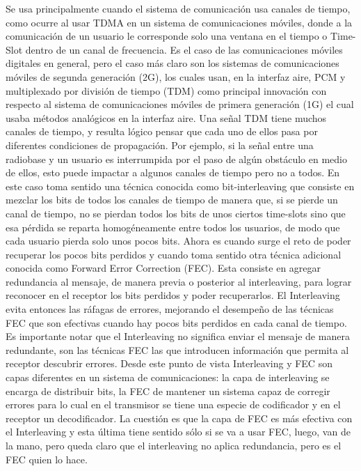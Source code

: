 Se usa principalmente cuando el sistema de comunicación usa canales de tiempo, como ocurre al usar TDMA en un sistema de comunicaciones móviles, donde a la comunicación de un usuario le corresponde solo una ventana en el tiempo o Time-Slot dentro de un canal de frecuencia. Es el caso de las comunicaciones móviles digitales en general, pero el caso más claro son los sistemas de comunicaciones móviles de segunda generación (2G), los cuales usan, en la interfaz aire, PCM y  multiplexado por división de tiempo (TDM) como principal innovación con respecto al sistema de comunicaciones móviles de primera generación (1G) el cual usaba métodos analógicos en la interfaz aire.
Una señal TDM tiene muchos canales de tiempo, y resulta lógico pensar que cada uno de ellos pasa por diferentes condiciones de propagación. Por ejemplo, si la señal entre una radiobase y un usuario es interrumpida por el paso de algún obstáculo en medio de ellos, esto puede impactar a algunos canales de tiempo pero no a todos. En este caso toma sentido una técnica conocida como bit-interleaving que consiste en mezclar los bits de todos los canales de tiempo de manera que, si se pierde un canal de tiempo, no se pierdan todos los bits de unos ciertos time-slots sino que esa pérdida se reparta homogéneamente entre todos los usuarios, de modo que cada usuario pierda solo unos pocos bits. Ahora es cuando surge el reto de poder recuperar los pocos bits perdidos y cuando toma sentido otra técnica adicional conocida como Forward Error Correction (FEC). Esta consiste en agregar redundancia al mensaje, de manera previa o posterior al interleaving, para lograr reconocer en el receptor los bits perdidos y poder recuperarlos. El Interleaving evita entonces las ráfagas de errores, mejorando el desempeño de las técnicas FEC que son efectivas cuando hay pocos bits perdidos en cada canal de tiempo. Es importante notar que el Interleaving no significa enviar el mensaje de manera redundante, son las técnicas FEC las que introducen información que permita al receptor descubrir errores. Desde este punto de vista Interleaving y FEC son capas diferentes en un sistema de comunicaciones: la capa de interleaving se encarga de distribuir bits, la FEC de mantener un sistema capaz de corregir errores para lo cual en el transmisor se tiene una especie de codificador y en el receptor un decodificador. La cuestión es que la capa de FEC es más efectiva con el Interleaving y esta última tiene sentido sólo si se va a usar FEC, luego, van de la mano, pero queda claro que el interleaving no aplica redundancia, pero es el FEC quien lo hace. \\

